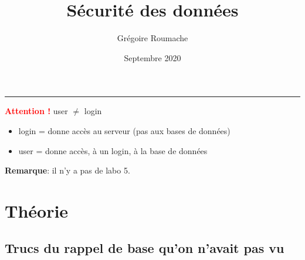 \documentclass[a4paper]{article}
\title{Sécurité des données}
\author{Grégoire Roumache}
\date{Septembre 2020}
\begin{document}
\maketitle

\tableofcontents





\begin{center} \rule{0.90\linewidth}{0.01cm} \end{center}

\textcolor{red}{\textbf{Attention !}} user $ \neq $ login
\begin{itemize}
    \item login = donne accès au serveur (pas aux bases de données)
    \item user = donne accès, à un login, à la base de données
\end{itemize}

\textbf{Remarque}: il n'y a pas de labo 5.















\section{Théorie}










\subsection{Trucs du rappel de base qu'on n'avait pas vu}
\end{document}
